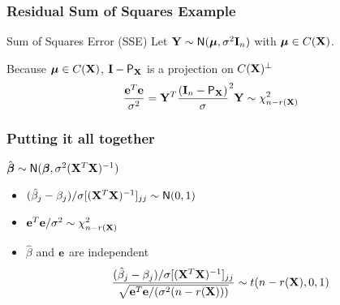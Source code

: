 \documentclass[handout]{beamer}
\begin{document}
\begin{frame} \frametitle{Residual Sum of Squares Example}
 
\begin{block}{Sum of Squares Error  (SSE)}
Let $\mathbf{Y} \sim \textsf{N}(\boldsymbol{\mu}, \sigma^2 \mathbf{I}_n)$ with $\boldsymbol{\mu} \in C(\mathbf{X})$.


Because $\boldsymbol{\mu} \in C(\mathbf{X})$, $\mathbf{I} - \textsf{P}_{\mathbf{X}}$ is a projection on
$C(\mathbf{X})^{\perp}$ \pause $$\frac{\mathbf{e}^T\mathbf{e}}{\sigma^2} = \mathbf{Y}^T\frac{(\mathbf{I}_n - \textsf{P}_{\mathbf{X}})}\sigma^2 \mathbf{Y}  \sim
 \chi^2_{n - r(\mathbf{X})}$$ 
\end{block}
\end{frame}

\begin{frame}\frametitle{Putting it all together}
$\hat{\boldsymbol{\beta}} \sim \textsf{N}(\boldsymbol{\beta}, \sigma^2 (\mathbf{X}^T\mathbf{X})^{-1})$
  \begin{itemize}
  \item $(\hat{\beta}_j - \beta_j)/ \sigma [(\mathbf{X}^T\mathbf{X})^{-1}]_{jj} \sim
    \textsf{N}(0,1)$
\item $\mathbf{e}^T\mathbf{e}/ \sigma^2 \sim \chi^2_{n - r(\mathbf{X})}$
\item $\hat{\beta}$ and $\mathbf{e}$ are independent
$$ \frac{(\hat{\beta}_j - \beta_j)/ \sigma [(\mathbf{X}^T\mathbf{X})^{-1}]_{jj}}
{\sqrt{\mathbf{e}^T\mathbf{e}/ ( \sigma^2 (n - r(\mathbf{X})))}} \sim t(n - r(\mathbf{X}), 0, 1)$$
  \end{itemize}
\end{frame}
\end{document}
